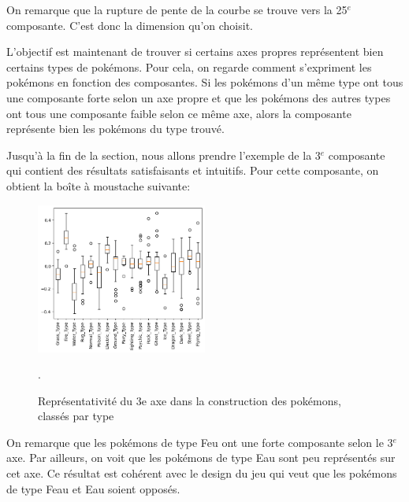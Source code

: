 \documentclass[a4paper,12pt]{article}
\begin{document}
On remarque que la rupture de pente de la courbe se trouve vers la 25$^{e}$
composante. C'est donc la dimension qu'on choisit.

L'objectif est maintenant de trouver si certains axes propres représentent bien
certains types de pokémons. Pour cela, on regarde comment s'expriment les
pokémons en fonction des composantes. Si les pokémons d'un même type ont tous
une composante forte selon un axe propre et que les pokémons des autres types
ont tous une composante faible selon ce même axe, alors la composante représente
bien les pokémons du type trouvé. 

Jusqu'à la fin de la section, nous allons prendre l'exemple de la 3$^{e}$
composante qui contient des résultats satisfaisants et intuitifs. Pour cette
composante, on obtient la boîte à moustache suivante: 
\begin{figure}[!h]
    \centering
    \includegraphics[width=0.5\textwidth]{moustache_MCA.png}
    \caption{Représentativité du 3e axe dans la construction des pokémons,
    classés par type}.
\end{figure}

On remarque que les pokémons de type Feu ont une forte composante selon le
3$^{e}$ axe. Par ailleurs, on voit que les pokémons de type Eau sont peu
représentés sur cet axe. Ce résultat est cohérent avec le design du jeu qui veut
que les pokémons de type Feau et Eau soient opposés. 
\end{document}

